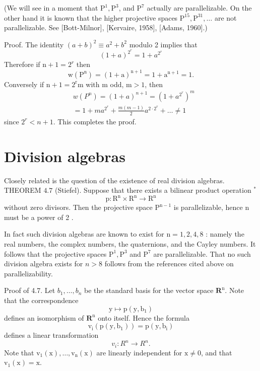 \documentclass[10pt]{article}
\begin{document}
(We will see in a moment that $\mathrm{P}^{1}, \mathrm{P}^{3}$, and $\mathrm{P}^{7}$ actually are parallelizable. On the other hand it is known that the higher projective spaces $\mathrm{P}^{15}, \mathrm{P}^{31}, \ldots$ are not parallelizable. See [Bott-Milnor], [Kervaire, 1958], [Adams, 1960].)

Proof. The identity $(a+b)^{2} \equiv a^{2}+b^{2}$ modulo 2 implies that
$$
(1+a)^{2^{r}}=1+a^{2^{r}}
$$
Therefore if $\mathrm{n}+1=2^{r}$ then
$$
\mathrm{w}\left(\mathrm{P}^{\mathrm{n}}\right)=(1+\mathrm{a})^{\mathrm{n}+1}=1+\mathrm{a}^{\mathrm{n}+1}=1 .
$$
Conversely if $\mathrm{n}+1=2^{\mathrm{r}} \mathrm{m}$ with $\mathrm{m}$ odd, $\mathrm{m}>1$, then
$$
\begin{aligned}
& w\left(P^{n}\right)=(1+a)^{n+1}=\left(1+a^{2^{r}}\right)^{m} \\
& =1+m a^{2^{r}}+\frac{m(m-1)}{2} a^{2 \cdot 2^{r}}+\ldots \neq 1
\end{aligned}
$$
since $2^{r}<n+1$. This completes the proof.

\section{Division algebras}
Closely related is the question of the existence of real division algebras. THEOREM $4.7$ (Stiefel). Suppose that there exists a bilinear product operation ${ }^{*}$
$$
\mathrm{p}: \mathrm{R}^{\mathrm{n}} \times \mathrm{R}^{\mathrm{n}} \rightarrow \mathrm{R}^{\mathrm{n}}
$$
without zero divisors. Then the projective space $\mathrm{P}^{\mathrm{n}-1}$ is parallelizable, hence $\mathrm{n}$ must be a power of 2 .

In fact such division algebras are known to exist for $\mathrm{n}=1,2,4,8$ : namely the real numbers, the complex numbers, the quaternions, and the Cayley numbers. It follows that the projective spaces $\mathrm{P}^{1}, \mathrm{P}^{3}$ and $\mathrm{P}^{7}$ are parallelizable. That no such division algebra exists for $n>8$ follows from the references cited above on parallelizability.

Proof of 4.7. Let $b_{1}, \ldots, b_{n}$ be the standard basis for the vector space $\mathbf{R}^{\mathrm{n}}$. Note that the correspondence
$$
\mathrm{y} \mapsto \mathrm{p}\left(\mathrm{y}, \mathrm{b}_{1}\right)
$$
defines an isomorphism of $\mathbf{R}^{\mathrm{n}}$ onto itself. Hence the formula
$$
\mathrm{v}_{\mathrm{i}}\left(\mathrm{p}\left(\mathrm{y}, \mathrm{b}_{1}\right)\right)=\mathrm{p}\left(\mathrm{y}, \mathrm{b}_{\mathrm{i}}\right)
$$
defines a linear transformation
$$
v_{i}: R^{n} \rightarrow R^{n} .
$$
Note that $\mathrm{v}_{1}(\mathrm{x}), \ldots, \mathrm{v}_{\mathrm{n}}(\mathrm{x})$ are linearly independent for $\mathrm{x} \neq 0$, and that $\mathrm{v}_{1}(\mathrm{x})=\mathrm{x}$.
\end{document}
